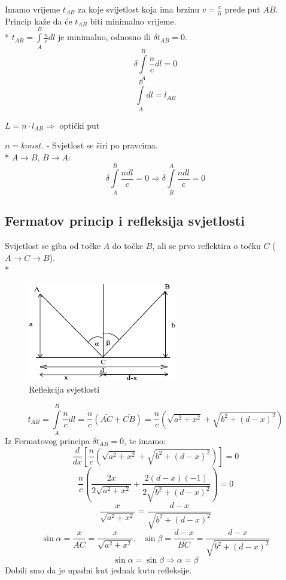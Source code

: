\documentclass{report}
\begin{document}
{Imamo vrijeme $t_{AB}$ za koje svijetlost koja ima brzinu $v = \frac{c}{n}$ pređe put $\overline{AB}$. Princip kaže da će $t_{AB}$ biti minimalno vrijeme.\\*
$t_{AB} = \int\limits_A^B {\frac{n}{c}dl}$ je minimalno, odnosno ili $\delta t_{AB} = 0$.
$$\delta \int\limits_A^B {\frac{n}{c}dl} = 0$$
$$\int \limits_A^B {dl} = l_{AB}$$
\begin{center}
	$L = n \cdot l_{AB} \Rightarrow$ optički put
\end{center}
$n = konst.$ - Svjetlost se širi po pravcima.\\*
$A \to B$, $B \to A$:
$$\delta \int\limits_A^B {\frac{ndl}{c}} = 0 \Rightarrow \delta \int\limits_B^A {\frac{ndl}{c}} = 0$$

\subsection{Fermatov princip i refleksija svjetlosti}

Svijetlost se giba od točke $A$ do točke $B$, ali se prvo reflektira o točku $C$ ($A \to C \to B$).\\*
\begin{figure}[htb!]
	\centering%
	\includegraphics{refleksija_svjetlosti.pdf}
  \caption{Reflekcija svjetlosti}
  \label{refleksija_svjetlosti}
\end{figure}
$$t_{AB} = \int\limits_A^B {\frac{n}{c} dl} = \frac{n}{c} \left (\overline {AC} + \overline {CB} \right) = \frac{n}{c} \left ( \sqrt{a^2+x^2}+\sqrt{b^2+(d-x)^2} \right)$$
Iz Fermatovog principa $\delta t_{AB} = 0$, te imamo:
$$\frac{d}{dx} \left [ \frac{n}{c} \left (\sqrt{a^2 + x^2} + \sqrt{b^2 + (d-x)^2} \right ) \right ] = 0$$
$$\frac{n}{c} \left ( \frac{2x}{2\sqrt{a^2 + x^2}} + \frac{2(d-x)(-1)}{2\sqrt{b^2 + (d-x)^2}} \right ) = 0$$
$$\frac{x}{\sqrt{a^2 + x^2}} = \frac{d-x}{\sqrt{b^2 + (d-x)^2}}$$
$$\sin \alpha = \frac{x}{\overline{AC}} = \frac{x}{\sqrt{a^2 + x^2}}, \ \ \ \sin \beta = \frac{d-x}{\overline{BC}} = \frac{d-x}{\sqrt{b^2+(d-x)^2}}$$
$$\sin \alpha = \sin \beta \Rightarrow \alpha = \beta$$
Dobili smo da je upadni kut jednak kutu refleksije.

}
\end{document}
